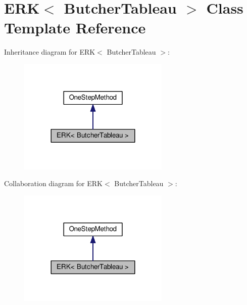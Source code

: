 \hypertarget{classERK}{}\section{E\+RK$<$ Butcher\+Tableau $>$ Class Template Reference}
\label{classERK}


Inheritance diagram for E\+RK$<$ Butcher\+Tableau $>$\+:
\nopagebreak
\begin{figure}[H]
\begin{center}
\leavevmode
\includegraphics[width=204pt]{classERK__inherit__graph}
\end{center}
\end{figure}


Collaboration diagram for E\+RK$<$ Butcher\+Tableau $>$\+:
\nopagebreak
\begin{figure}[H]
\begin{center}
\leavevmode
\includegraphics[width=204pt]{classERK__coll__graph}
\end{center}
\end{figure}
